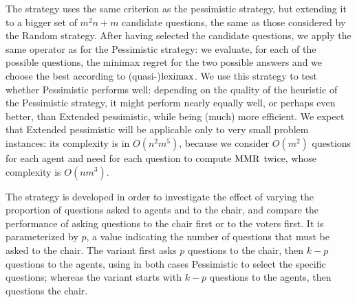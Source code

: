 \documentclass[sigconf, anonymous]{aamas}
\begin{document}
The  strategy uses the same criterion as the pessimistic strategy, but extending it to a bigger set of $m^2 n + m$ candidate questions, the same as those considered by the Random strategy.
After having selected the candidate questions, we apply the same operator as for the Pessimistic strategy: we evaluate, for each of the possible questions, the minimax regret for the two possible answers and we choose the best according to (quasi-)$\operatorname{leximax}$.
We use this strategy to test whether Pessimistic performs well: depending on the quality of the heuristic of the Pessimistic strategy, it might perform nearly equally well, or perhaps even better, than Extended pessimistic, while being (much) more efficient. We expect that Extended pessimistic will be applicable only to very small problem instances: its complexity is in $O(n^2 m^5)$, because we consider $O(m^2)$ questions for each agent and need for each question to compute $\operatorname{MMR}$ twice, whose complexity is $O(nm^3)$.

The  strategy is developed in order to investigate the effect of varying the proportion of questions asked to agents and to the chair, and compare the performance of asking questions to the chair first or to the voters first. It is parameterized by $p$, a value indicating the number of questions that must be asked to the chair.
The  variant first asks $p$ questions to the chair, then $k-p$ questions to the agents, using in both cases Pessimistic to select the specific questions; whereas the  variant starts with $k - p$ questions to the agents, then questions the chair. 
\end{document}
